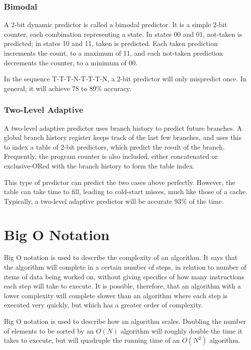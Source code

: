 \subsubsection{Bimodal}
A 2-bit dynamic predictor is called a bimodal predictor. It is a simple 2-bit
counter, each combination representing a state. In states 00 and 01, not-taken
is predicted; in states 10 and 11, taken is predicted. Each taken prediction
increments the count, to a maximum of 11, and each not-taken prediction
decrements the counter, to a minimum of 00.

In the sequence T-T-T-N-T-T-T-N, a 2-bit predictor will only mispredict once.
In general, it will achieve 78 to 89\% accuracy.

\subsubsection{Two-Level Adaptive}
A two-level adaptive predictor uses branch history to predict future branches. A
global branch history register keeps track of the last few branches, and uses
this to index a table of 2-bit predictors, which predict the result of the
branch. Frequently, the program counter is also included, either concatenated or
exclusive-ORed with the branch history to form the table index.

This type of predictor can predict the two cases above perfectly.  However, the
table can take time to fill, leading to cold-start misses, much like those of a
cache. Typically, a two-level adaptive predictor will be accurate 93\% of the time.

\section{Big O Notation}
Big O notation is used to describe the complexity of an algorithm. It says that
the algorithm will complete in a certain number of steps, in relation to number
of items of data being worked on, without giving specifics of how many
instructions each step will take to execute. It is possible, therefore, that an
algorithm with a lower complexity will complete slower than an algorithm where
each step is executed very quickly, but which has a greater order of complexity.

Big O notation is used to describe how an algorithm scales. Doubling the number
of elements to be sorted by an $O(N)$ algorithm will roughly double the time it
takes to execute, but will quadruple the running time of an $O(N^2)$ algorithm.

